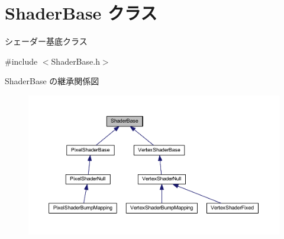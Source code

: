 \hypertarget{class_shader_base}{}\section{Shader\+Base クラス}
\label{class_shader_base}


シェーダー基底クラス  




{\ttfamily \#include $<$Shader\+Base.\+h$>$}



Shader\+Base の継承関係図\nopagebreak
\begin{figure}[H]
\begin{center}
\leavevmode
\includegraphics[width=350pt]{class_shader_base__inherit__graph}
\end{center}
\end{figure}
